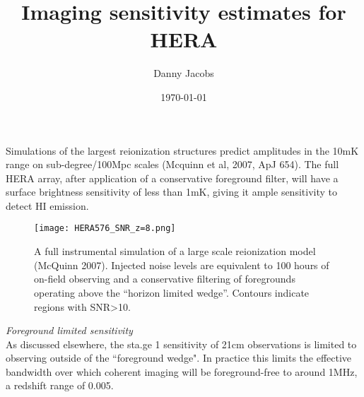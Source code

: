 \documentclass[12pt,preprint]{aastex}
\title{Imaging sensitivity estimates for HERA}
\author{Danny Jacobs }
\date{\centering \today } %
\begin{document}
Simulations of the largest reionization structures predict amplitudes in the 10mK range on sub-degree/100Mpc scales (Mcquinn et al, 2007, ApJ 654).   The full HERA array, after application of a conservative foreground filter, will have a surface brightness sensitivity of less than 1mK, giving it ample sensitivity to detect HI emission.  
\begin{figure}[htb]
\texttt{[image: HERA576\_SNR\_z=8.png]}
\caption{A full instrumental simulation of a large scale reionization model (McQuinn 2007). Injected noise levels are equivalent to 100 hours of on-field observing and a conservative filtering of foregrounds operating above the ``horizon limited wedge''. Contours indicate regions with SNR>10. }
\end{figure}



\emph{Foreground limited sensitivity}\\
As discussed elsewhere, the sta.ge 1 sensitivity of 21cm observations is limited to observing outside of the ``foreground wedge".  In practice this limits the effective bandwidth over which coherent imaging will be foreground-free to around 1MHz, a redshift range of 0.005.
\end{document}
